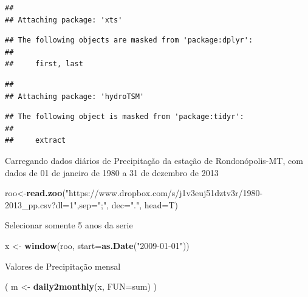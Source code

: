 \documentclass[
]{book}
\newenvironment{Shaded}{\begin{snugshade}}{\end{snugshade}}
\newcommand{\DataTypeTok}[1]{\textcolor[rgb]{0.13,0.29,0.53}{#1}}
\newcommand{\KeywordTok}[1]{\textcolor[rgb]{0.13,0.29,0.53}{\textbf{#1}}}
\newcommand{\NormalTok}[1]{#1}
\newcommand{\StringTok}[1]{\textcolor[rgb]{0.31,0.60,0.02}{#1}}
\begin{document}
\begin{verbatim}
## 
## Attaching package: 'xts'
\end{verbatim}

\begin{verbatim}
## The following objects are masked from 'package:dplyr':
## 
##     first, last
\end{verbatim}

\begin{verbatim}
## 
## Attaching package: 'hydroTSM'
\end{verbatim}

\begin{verbatim}
## The following object is masked from 'package:tidyr':
## 
##     extract
\end{verbatim}

Carregando dados diários de Precipitação da estação de Rondonópolis-MT, com dados de 01 de janeiro de 1980 a 31 de dezembro de 2013

\begin{Shaded}
\begin{Highlighting}[]
\NormalTok{roo<-}\KeywordTok{read.zoo}\NormalTok{(}\StringTok{"https://www.dropbox.com/s/j1v3euj51dztv3r/1980-2013_pp.csv?dl=1"}\NormalTok{,}\DataTypeTok{sep=}\StringTok{";"}\NormalTok{, }\DataTypeTok{dec=}\StringTok{"."}\NormalTok{, }\DataTypeTok{head=}\NormalTok{T)}
\end{Highlighting}
\end{Shaded}

Selecionar somente 5 anos da serie

\begin{Shaded}
\begin{Highlighting}[]
\NormalTok{x <-}\StringTok{ }\KeywordTok{window}\NormalTok{(roo, }\DataTypeTok{start=}\KeywordTok{as.Date}\NormalTok{(}\StringTok{"2009-01-01"}\NormalTok{))}
\end{Highlighting}
\end{Shaded}

Valores de Precipitação mensal

\begin{Shaded}
\begin{Highlighting}[]
\NormalTok{( m <-}\StringTok{ }\KeywordTok{daily2monthly}\NormalTok{(x, }\DataTypeTok{FUN=}\NormalTok{sum) )}
\end{Highlighting}
\end{Shaded}
\end{document}

